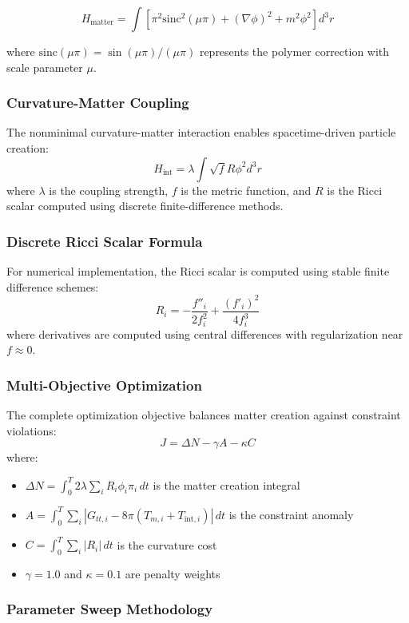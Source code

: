 \documentclass[11pt]{article}
\begin{document}
\[
H_{\text{matter}} = \int \left[ \pi^2 \text{sinc}^2(\mu \pi) + (\nabla \phi)^2 + m^2 \phi^2 \right] d^3r
\]

where $\text{sinc}(\mu \pi) = \sin(\mu \pi)/(\mu \pi)$ represents the polymer correction with scale parameter $\mu$.

\subsubsection*{Curvature-Matter Coupling}

The nonminimal curvature-matter interaction enables spacetime-driven particle creation:
\[
H_{\text{int}} = \lambda \int \sqrt{f} R \phi^2 d^3r
\]
where $\lambda$ is the coupling strength, $f$ is the metric function, and $R$ is the Ricci scalar computed using discrete finite-difference methods.

\subsubsection*{Discrete Ricci Scalar Formula}

For numerical implementation, the Ricci scalar is computed using stable finite difference schemes:
\[
R_i = -\frac{f''_i}{2f_i^2} + \frac{(f'_i)^2}{4f_i^3}
\]
where derivatives are computed using central differences with regularization near $f \approx 0$.

\subsubsection*{Multi-Objective Optimization}

The complete optimization objective balances matter creation against constraint violations:
\[
J = \Delta N - \gamma A - \kappa C
\]
where:
\begin{itemize}
\item $\Delta N = \int_0^T 2\lambda \sum_i R_i \phi_i \pi_i \, dt$ is the matter creation integral
\item $A = \int_0^T \sum_i |G_{tt,i} - 8\pi(T_{m,i} + T_{\text{int},i})| \, dt$ is the constraint anomaly
\item $C = \int_0^T \sum_i |R_i| \, dt$ is the curvature cost
\item $\gamma = 1.0$ and $\kappa = 0.1$ are penalty weights
\end{itemize}

\subsubsection*{Parameter Sweep Methodology}
\end{document}
